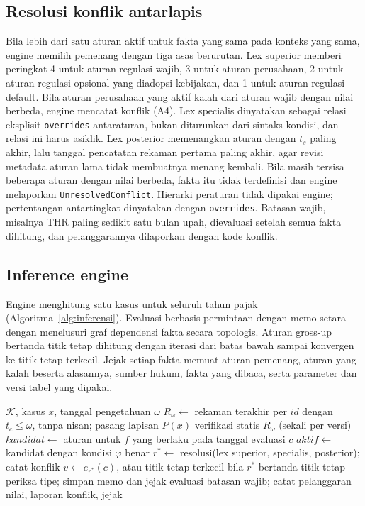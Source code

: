 \documentclass[journal,a4paper]{IEEEtran}
\makeatletter
\DeclareRobustCommand{\en}[1]{{\usefont{\f@encoding}{\f@family}{\f@series}{it}#1\/}}
\newcommand{\K}{\mathcal{K}}
\makeatother
\begin{document}
\subsection{Resolusi konflik antarlapis}
Bila lebih dari satu aturan aktif untuk fakta yang sama pada konteks yang sama, \en{engine} memilih pemenang dengan tiga asas berurutan. \en{Lex superior} memberi peringkat 4 untuk aturan regulasi wajib, 3 untuk aturan perusahaan, 2 untuk aturan regulasi opsional yang diadopsi kebijakan, dan 1 untuk aturan regulasi \en{default}. Bila aturan perusahaan yang aktif kalah dari aturan wajib dengan nilai berbeda, \en{engine} mencatat konflik (A4). \en{Lex specialis} dinyatakan sebagai relasi eksplisit \texttt{overrides} antaraturan, bukan diturunkan dari sintaks kondisi, dan relasi ini harus asiklik. \en{Lex posterior} memenangkan aturan dengan $t_s$ paling akhir, lalu tanggal pencatatan rekaman pertama paling akhir, agar revisi metadata aturan lama tidak membuatnya menang kembali. Bila masih tersisa beberapa aturan dengan nilai berbeda, fakta itu tidak terdefinisi dan \en{engine} melaporkan \texttt{UnresolvedConflict}. Hierarki peraturan tidak dipakai \en{engine}; pertentangan antartingkat dinyatakan dengan \texttt{overrides}. Batasan wajib, misalnya THR paling sedikit satu bulan upah, dievaluasi setelah semua fakta dihitung, dan pelanggarannya dilaporkan dengan kode konflik.

\subsection{\en{Inference engine}}
\en{Engine} menghitung satu kasus untuk seluruh tahun pajak (Algoritma~\ref{alg:inferensi}). Evaluasi berbasis permintaan dengan memo setara dengan menelusuri graf dependensi fakta secara topologis. Aturan \en{gross-up} bertanda titik tetap dihitung dengan iterasi dari batas bawah sampai konvergen ke titik tetap terkecil. Jejak setiap fakta memuat aturan pemenang, aturan yang kalah beserta alasannya, sumber hukum, fakta yang dibaca, serta parameter dan versi tabel yang dipakai.

\begin{algorithm}[t]
\caption{Inferensi untuk satu pegawai dan satu tahun pajak}
\label{alg:inferensi}
\begin{algorithmic}[1]
\Require $\K$, kasus $x$, tanggal pengetahuan $\omega$
\State $R_\omega \gets$ rekaman terakhir per $\mathit{id}$ dengan $t_c \leq \omega$, tanpa nisan; pasang lapisan $P(x)$
\State verifikasi statis $R_\omega$ (sekali per versi)
  \State $\mathit{kandidat} \gets$ aturan untuk $f$ yang berlaku pada tanggal evaluasi $c$
  \State $\mathit{aktif} \gets$ kandidat dengan kondisi $\varphi$ benar
  \State $r^{*} \gets$ resolusi(\en{lex superior}, \en{specialis}, \en{posterior}); catat konflik
  \State $v \gets e_{r^{*}}(c)$, atau titik tetap terkecil bila $r^{*}$ bertanda titik tetap
  \State periksa tipe; simpan memo dan jejak
\EndFor
\State evaluasi batasan wajib; catat pelanggaran
\State \Return nilai, laporan konflik, jejak
\end{algorithmic}
\end{algorithm}
\end{document}

